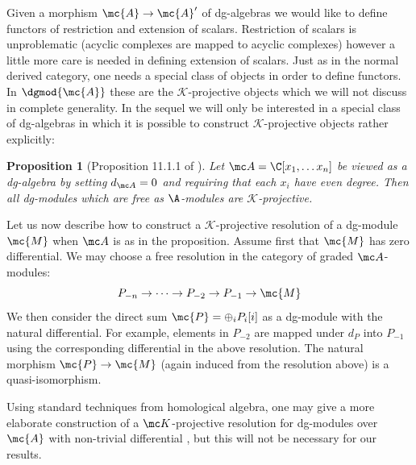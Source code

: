\documentclass[12pt]{wart}
\newtheorem{prop}[thm]{Proposition}
\theoremstyle{remark}
\begin{document}
Given a morphism $\mc{A} \to \mc{A}^{\prime}$ of dg-algebras we would like to
define functors of restriction and extension of scalars. Restriction
of scalars is unproblematic (acyclic complexes are mapped to acyclic
complexes) however a little more care is needed in defining extension
of scalars.  Just as in the normal derived category, one needs a
special class of objects in order to define functors. In $\dgmod{\mc{A}}$
these are the $\mathcal{K}$-projective objects \cite{BL} which we will
not discuss in complete generality. In the sequel we will only be
interested in a special class of dg-algebras in which it is possible
to construct $\mathcal{K}$-projective objects rather explicitly:

\begin{prop}[Proposition 11.1.1 of \cite{BL}] 
  Let $\mc A = \C[x_1, \dots x_n]$ be viewed as a dg-algebra by setting
  $d_{\mc A} = 0$ and requiring that each $x_i$ have even degree. Then all
  dg-modules which are free as $\A$-modules are
  $\mathcal{K}$-projective.
\end{prop}

Let us now describe how to construct a $\mathcal{K}$-projective
resolution of a dg-module $\mc{M}$ when $\mc A$ is as in the proposition.
Assume first that $\mc{M}$ has zero differential. We may choose a free
resolution in the category of graded $\mc A$-modules:
\begin{displaymath}
P_{-n} \to \dots \to P_{-2} \to P_{-1} \to \mc{M}
\end{displaymath}
We then consider the direct sum $\mc{P} = \oplus_i P_i[i]$ as a dg-module with the
natural differential. For example, elements in $P_{-2}$ are mapped
under $d_P$ into $P_{-1}$ using the corresponding differential in the
above resolution. The natural morphism $\mc{P} \to
\mc{M}$ (again induced from the resolution above) is a quasi-isomorphism.

Using standard techniques from homological algebra, one may give a
more elaborate construction of a $\mc K$-projective resolution for
dg-modules over $\mc{A}$ with non-trivial differential \cite{BL}, but this will not be
necessary for our results.

\end{document}
